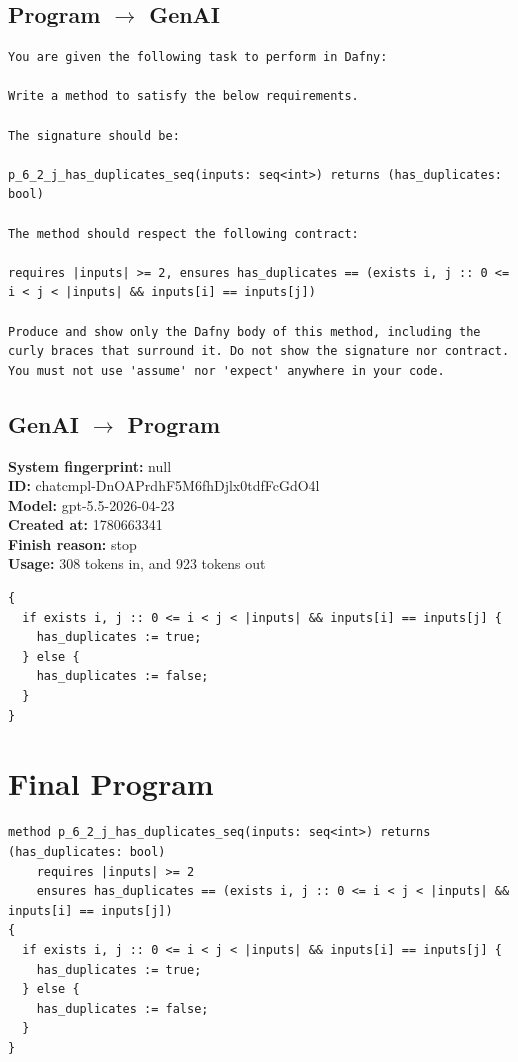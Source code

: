 \documentclass{article}
\begin{document}
\subsection*{Program $\rightarrow$ GenAI}
\begin{lstlisting}
You are given the following task to perform in Dafny:

Write a method to satisfy the below requirements.

The signature should be:

p_6_2_j_has_duplicates_seq(inputs: seq<int>) returns (has_duplicates: bool)

The method should respect the following contract:

requires |inputs| >= 2, ensures has_duplicates == (exists i, j :: 0 <= i < j < |inputs| && inputs[i] == inputs[j])

Produce and show only the Dafny body of this method, including the curly braces that surround it. Do not show the signature nor contract. You must not use 'assume' nor 'expect' anywhere in your code.
\end{lstlisting}
\subsection*{GenAI $\rightarrow$ Program}
\textbf{System fingerprint: }null
\\\textbf{ID: }chatcmpl-DnOAPrdhF5M6fhDjlx0tdfFcGdO4l
\\\textbf{Model: }gpt-5.5-2026-04-23
\\\textbf{Created at: }1780663341
\\\textbf{Finish reason: }stop
\\\textbf{Usage: }308 tokens in, and 923 tokens out
\begin{lstlisting}
{
  if exists i, j :: 0 <= i < j < |inputs| && inputs[i] == inputs[j] {
    has_duplicates := true;
  } else {
    has_duplicates := false;
  }
}
\end{lstlisting}
\section*{Final Program}
\begin{lstlisting}
method p_6_2_j_has_duplicates_seq(inputs: seq<int>) returns (has_duplicates: bool)
	requires |inputs| >= 2
	ensures has_duplicates == (exists i, j :: 0 <= i < j < |inputs| && inputs[i] == inputs[j])
{
  if exists i, j :: 0 <= i < j < |inputs| && inputs[i] == inputs[j] {
    has_duplicates := true;
  } else {
    has_duplicates := false;
  }
}
\end{lstlisting}
\end{document}
